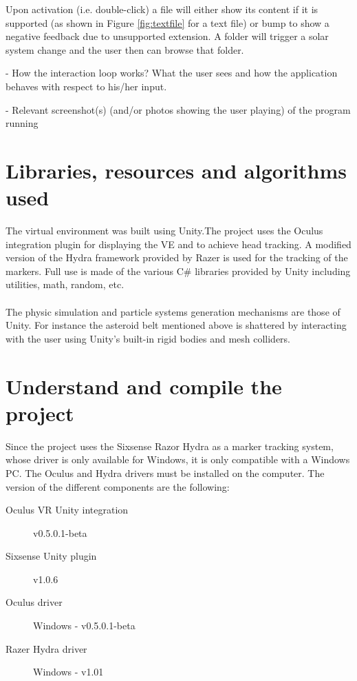 \documentclass[paper=a4, fontsize=11pt]{scrartcl} %
\numberwithin{equation}{section} %
\numberwithin{figure}{section} %
\numberwithin{table}{section} %
\begin{document}
Upon activation (i.e. double-click) a file will either show its content if it is supported (as shown in Figure \ref{fig:textfile} for a text file) or bump to show a negative feedback due to unsupported extension. A folder will trigger a solar system change and the user then can browse that folder.

- How the interaction loop works? What the user sees and how the application behaves with respect to his/her input.

- Relevant screenshot(s) (and/or photos showing the user playing) of the program running


\section{Libraries, resources and algorithms used}
The virtual environment was built using Unity.The project uses the Oculus integration plugin for displaying the VE and to achieve head tracking. A modified version of the Hydra framework provided by Razer is used for the tracking of the markers. Full use is made of the various C\# libraries provided by Unity including utilities, math, random, etc.
\\\\
The physic simulation and particle systems generation mechanisms are those of Unity. For instance the asteroid belt mentioned above is shattered by interacting with the user using Unity's built-in rigid bodies and mesh colliders.

	
	\section{Understand and compile the project}
	Since the project uses the Sixsense Razor Hydra as a marker tracking system, whose driver is only available for Windows, it is only compatible with a Windows PC. The Oculus and Hydra drivers must be installed on the computer. The version of the different components are the following:
	\begin{description}
		\item[Oculus VR Unity integration] v0.5.0.1-beta
		\item[Sixsense Unity plugin] v1.0.6
		\item[Oculus driver] Windows - v0.5.0.1-beta
		\item[Razer Hydra driver] Windows - v1.01
	\end{description}
	
\end{document}
